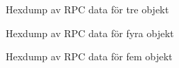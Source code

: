 \begin{figure}[H]
    \scriptsize
    \center
    
    \caption{Hexdump av RPC data för tre objekt}
    \label{fig:tim-rpcdata3}
\end{figure}

\begin{figure}[H]
    \scriptsize
    \center
    
    \caption{Hexdump av RPC data för fyra objekt}
    \label{fig:tim-rpcdata4}
\end{figure}

\begin{figure}[H]
    \scriptsize
    \center
    
    \caption{Hexdump av RPC data för fem objekt}
    \label{fig:tim-rpcdata5}
\end{figure}
